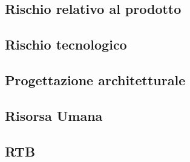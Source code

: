 \subsection{Rischio relativo al prodotto} 

\subsection{Rischio tecnologico} 

\subsection{Progettazione architetturale} 

\subsection{Risorsa Umana} 

\subsection{RTB} 

